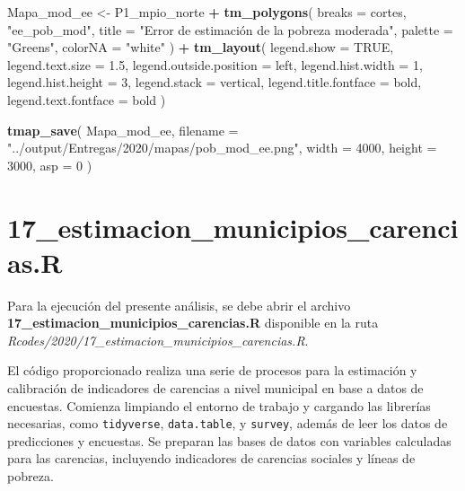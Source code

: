 \documentclass[
  12pt,
]{book}
\newenvironment{Shaded}{\begin{snugshade}}{\end{snugshade}}
\newcommand{\AttributeTok}[1]{\textcolor[rgb]{0.13,0.29,0.53}{#1}}
\newcommand{\ConstantTok}[1]{\textcolor[rgb]{0.56,0.35,0.01}{#1}}
\newcommand{\DecValTok}[1]{\textcolor[rgb]{0.00,0.00,0.81}{#1}}
\newcommand{\FloatTok}[1]{\textcolor[rgb]{0.00,0.00,0.81}{#1}}
\newcommand{\FunctionTok}[1]{\textcolor[rgb]{0.13,0.29,0.53}{\textbf{#1}}}
\newcommand{\NormalTok}[1]{#1}
\newcommand{\OtherTok}[1]{\textcolor[rgb]{0.56,0.35,0.01}{#1}}
\newcommand{\SpecialCharTok}[1]{\textcolor[rgb]{0.81,0.36,0.00}{\textbf{#1}}}
\newcommand{\StringTok}[1]{\textcolor[rgb]{0.31,0.60,0.02}{#1}}
\begin{document}
\begin{Shaded}
\begin{Highlighting}[]
\NormalTok{Mapa\_mod\_ee }\OtherTok{\textless{}{-}}
\NormalTok{  P1\_mpio\_norte }\SpecialCharTok{+} \FunctionTok{tm\_polygons}\NormalTok{(}
    \AttributeTok{breaks =}\NormalTok{ cortes,}
    \StringTok{"ee\_pob\_mod"}\NormalTok{,}
    \AttributeTok{title =} \StringTok{"Error de estimación de la pobreza moderada"}\NormalTok{,}
    \AttributeTok{palette =} \StringTok{"Greens"}\NormalTok{,}
    \AttributeTok{colorNA =} \StringTok{"white"}
\NormalTok{  ) }\SpecialCharTok{+} \FunctionTok{tm\_layout}\NormalTok{(}
    \AttributeTok{legend.show =} \ConstantTok{TRUE}\NormalTok{,}
    \AttributeTok{legend.text.size =} \FloatTok{1.5}\NormalTok{,}
    \AttributeTok{legend.outside.position =} \StringTok{\textquotesingle{}left\textquotesingle{}}\NormalTok{,}
    \AttributeTok{legend.hist.width =} \DecValTok{1}\NormalTok{,}
    \AttributeTok{legend.hist.height =} \DecValTok{3}\NormalTok{,}
    \AttributeTok{legend.stack =} \StringTok{\textquotesingle{}vertical\textquotesingle{}}\NormalTok{,}
    \AttributeTok{legend.title.fontface =} \StringTok{\textquotesingle{}bold\textquotesingle{}}\NormalTok{,}
    \AttributeTok{legend.text.fontface =} \StringTok{\textquotesingle{}bold\textquotesingle{}}
\NormalTok{  )}

\FunctionTok{tmap\_save}\NormalTok{(}
\NormalTok{  Mapa\_mod\_ee,}
  \AttributeTok{filename =} \StringTok{"../output/Entregas/2020/mapas/pob\_mod\_ee.png"}\NormalTok{,}
  \AttributeTok{width =} \DecValTok{4000}\NormalTok{,}
  \AttributeTok{height =} \DecValTok{3000}\NormalTok{,}
  \AttributeTok{asp =} \DecValTok{0}
\NormalTok{)}
\end{Highlighting}
\end{Shaded}

\hypertarget{estimacion_municipios_carencias.r}{%
\chapter*{17\_estimacion\_municipios\_carencias.R}\label{estimacion_municipios_carencias.r}}

Para la ejecución del presente análisis, se debe abrir el archivo \textbf{17\_estimacion\_municipios\_carencias.R} disponible en la ruta \emph{Rcodes/2020/17\_estimacion\_municipios\_carencias.R}.

El código proporcionado realiza una serie de procesos para la estimación y calibración de indicadores de carencias a nivel municipal en base a datos de encuestas. Comienza limpiando el entorno de trabajo y cargando las librerías necesarias, como \texttt{tidyverse}, \texttt{data.table}, y \texttt{survey}, además de leer los datos de predicciones y encuestas. Se preparan las bases de datos con variables calculadas para las carencias, incluyendo indicadores de carencias sociales y líneas de pobreza.
\end{document}
